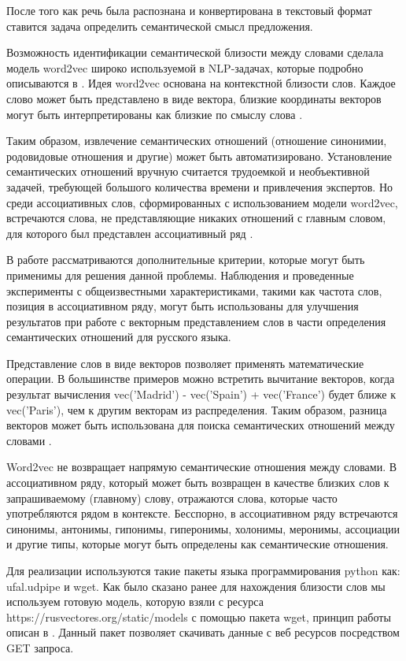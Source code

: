 После того как речь была распознана и конвертирована в текстовый формат ставится задача определить
семантической смысл предложения.  

Возможность идентификации семантической близости между словами сделала модель word2vec широко используемой в NLP-задачах, которые подробно описываются в \cite{neural05}. 
Идея word2vec основана на контекстной близости слов. Каждое слово может быть представлено в виде вектора, 
близкие координаты векторов могут быть интерпретированы как близкие по смыслу слова \cite{seman04}. 

Таким образом, извлечение семантических отношений (отношение синонимии, родовидовые отношения и другие) может быть автоматизировано. 
Установление семантических отношений вручную считается трудоемкой и необъективной задачей, требующей большого количества времени и 
привлечения экспертов. Но среди ассоциативных слов, сформированных с использованием модели word2vec, встречаются слова, не 
представляющие никаких отношений с главным словом, для которого был представлен ассоциативный ряд \cite{seman03}.

В работе рассматриваются дополнительные критерии, которые могут быть применимы для решения данной проблемы. Наблюдения и проведенные 
эксперименты с общеизвестными характеристиками, такими как частота слов, позиция в ассоциативном ряду, могут быть использованы для 
улучшения результатов при работе с векторным представлением слов в части определения семантических отношений для русского языка. 

Представление слов в виде векторов позволяет применять математические операции. В большинстве примеров можно встретить вычитание векторов, 
когда результат вычисления vec('Madrid') - vec('Spain') + vec('France') будет ближе к vec('Paris'), чем к другим векторам из распределения. 
Таким образом, разница векторов может быть использована для поиска семантических отношений между словами \cite{seman02}.

Word2vec не возвращает напрямую семантические отношения между словами. В ассоциативном ряду, который может быть возвращен 
в качестве близких слов к запрашиваемому (главному) слову, отражаются слова, которые часто употребляются рядом в контексте. 
Бесспорно, в ассоциативном ряду встречаются синонимы, антонимы, гипонимы, гиперонимы, холонимы, меронимы, ассоциации и другие 
типы, которые могут быть определены как семантические отношения.


Для реализации используются такие пакеты языка программирования python как: ufal.udpipe и wget. 
Как было сказано ранее для нахождения близости слов мы используем готовую модель, которую взяли с ресурса 
https://rusvectores.org/static/models с помощью пакета wget, принцип работы описан в \cite{neural08}. Данный пакет позволяет скачивать данные 
с веб ресурсов посредством GET запроса.

